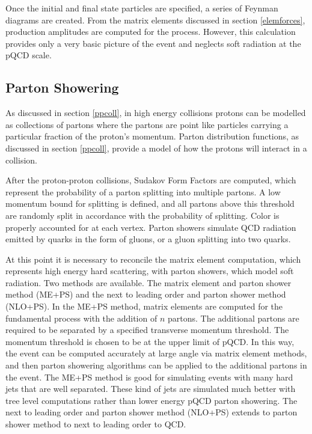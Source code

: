 \documentclass[oneside, letterpaper, oldfontcommands]{memoir}
\begin{document}
\qquad  Once the initial and final state particles are specified, a series of Feynman diagrams are created. From the matrix elements discussed in section \ref{elemforces}, production amplitudes are computed for the process.
However, this calculation provides only a very basic picture of the event and neglects soft radiation at the pQCD scale. 
\subsection{Parton Showering}\label{partonshower}
\qquad As discussed in section \ref{ppcoll}, in high energy collisions protons can be modelled as collections of partons where the partons are point like particles carrying a particular fraction of the proton's momentum. Parton distribution functions, as discussed in section \ref{ppcoll}, provide a model of how the protons will interact in a collision. 

\qquad After the proton-proton collisions, Sudakov Form Factors\cite{Agashe:2014kda} are computed, which represent the probability of a parton splitting into multiple partons. A low momentum bound for splitting is defined, and all partons above this threshold are randomly split in accordance with the probability of splitting. Color is properly accounted for at each vertex. Parton showers simulate QCD radiation emitted by quarks in the form of gluons, or a gluon splitting into two quarks.

\qquad At this point it is necessary to reconcile the matrix element computation, which represents high energy hard scattering, with parton showers, which model soft radiation. Two methods are available. The matrix element and parton shower method (ME+PS) and the next to leading order and parton shower method (NLO+PS)\cite{Agashe:2014kda}. In the ME+PS method, matrix elements are computed for the fundamental process with the addition of $n$ partons. The additional partons are required to be separated by a specified transverse momentum threshold. The momentum threshold is chosen to be at the upper limit of pQCD. In this way, the event can be computed accurately at large angle via matrix element methods, and then parton showering algorithms can be applied to the additional partons in the event. The ME+PS method is good for simulating events with many hard jets that are well separated. These kind of jets are simulated much better with tree level computations rather than lower energy pQCD parton showering. The next to leading order and parton shower method (NLO+PS) extends to parton shower method to next to leading order to QCD. 
\end{document}
